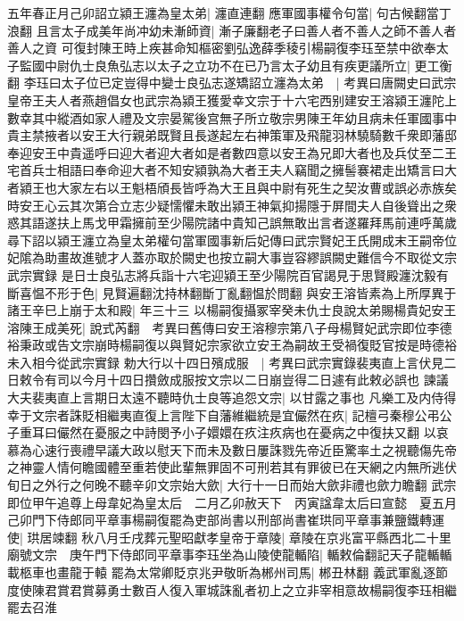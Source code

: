 五年春正月己卯詔立潁王瀍為皇太弟|{
	瀍直連翻}
應軍國事權令句當|{
	句古候翻當丁浪翻}
且言太子成美年尚冲幼未漸師資|{
	漸子廉翻老子曰善人者不善人之師不善人者善人之資}
可復封陳王時上疾甚命知樞密劉弘逸薛季稜引楊嗣復李珏至禁中欲奉太子監國中尉仇士良魚弘志以太子之立功不在已乃言太子幼且有疾更議所立|{
	更工衡翻}
李珏曰太子位已定豈得中變士良弘志遂矯詔立瀍為太弟　|{
	考異曰唐闕史曰武宗皇帝王夫人者燕趙倡女也武宗為潁王獲愛幸文宗于十六宅西别建安王溶潁王瀍陀上數幸其中縱酒如家人禮及文宗晏駕後宫無子所立敬宗男陳王年幼且病未任軍國事中貴主禁掖者以安王大行親弟既賢且長遂起左右神策軍及飛龍羽林驍騎數千衆即藩邸奉迎安王中貴遥呼曰迎大者迎大者如是者數四意以安王為兄即大者也及兵仗至二王宅首兵士相語曰奉命迎大者不知安潁孰為大者王夫人竊聞之擁髻褰裙走出矯言曰大者潁王也大家左右以王魁梧頎長皆呼為大王且與中尉有死生之契汝曹或誤必赤族矣時安王心云其次第合立志少疑懦懼未敢出潁王神氣抑揚隱于屏間夫人自後聳出之衆惑其語遂扶上馬戈甲霜擁前至少陽院諸中貴知己誤無敢出言者遂羅拜馬前連呼萬歲尋下詔以潁王瀍立為皇太弟權句當軍國事新后妃傳曰武宗賢妃王氏開成末王嗣帝位妃隂為助畫故進號才人蓋亦取於闕史也按立嗣大事豈容繆誤闕史難信今不取從文宗武宗實録}
是日士良弘志將兵詣十六宅迎潁王至少陽院百官謁見于思賢殿瀍沈毅有斷喜愠不形于色|{
	見賢遍翻沈持林翻斷丁亂翻愠於問翻}
與安王溶皆素為上所厚異于諸王辛巳上崩于太和殿|{
	年三十三}
以楊嗣復攝冢宰癸未仇士良說太弟賜楊貴妃安王溶陳王成美死|{
	說式芮翻　考異曰舊傳曰安王溶穆宗第八子母楊賢妃武宗即位李德裕秉政或告文宗崩時楊嗣復以與賢妃宗家欲立安王為嗣故王受禍復貶官按是時德裕未入相今從武宗實録}
勅大行以十四日殯成服　|{
	考異曰武宗實錄裴夷直上言伏見二日敕令有司以今月十四日攢斂成服按文宗以二日崩豈得二日遽有此敕必誤也}
諫議大夫裴夷直上言期日太遠不聽時仇士良等追怨文宗|{
	以甘露之事也}
凡樂工及内侍得幸于文宗者誅貶相繼夷直復上言陛下自藩維繼統是宜儼然在疚|{
	記檀弓秦穆公弔公子重耳曰儼然在憂服之中詩閔予小子嬛嬛在疚注疚病也在憂病之中復扶又翻}
以哀慕為心速行喪禮早議大政以慰天下而未及數日屢誅戮先帝近臣驚率土之視聽傷先帝之神靈人情何瞻國體至重若使此輩無罪固不可刑若其有罪彼已在天網之内無所逃伏旬日之外行之何晚不聽辛卯文宗始大歛|{
	大行十一日而始大歛非禮也歛力瞻翻}
武宗即位甲午追尊上母韋妃為皇太后　二月乙卯赦天下　丙寅諡韋太后曰宣懿　夏五月己卯門下侍郎同平章事楊嗣復罷為吏部尚書以刑部尚書崔珙同平章事兼鹽鐵轉運使|{
	珙居竦翻}
秋八月壬戌葬元聖昭獻孝皇帝于章陵|{
	章陵在京兆富平縣西北二十里}
廟號文宗　庚午門下侍郎同平章事李珏坐為山陵使龍輴陷|{
	輴敕倫翻記天子龍輴輴載柩車也畫龍于轅}
罷為太常卿貶京兆尹敬昕為郴州司馬|{
	郴丑林翻}
義武軍亂逐節度使陳君賞君賞募勇士數百人復入軍城誅亂者初上之立非宰相意故楊嗣復李珏相繼罷去召淮

